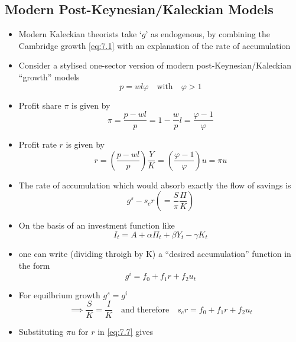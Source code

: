 \documentclass{article}
\begin{document}
\subsection{Modern Post-Keynesian/Kaleckian Models}
	\begin{itemize}
		\item Modern Kaleckian theorists take `\( g \)' as endogenous, by combining the Cambridge growth \cref{eq:7.1} with an explanation of the rate of accumulation
		\item Consider a stylised one-sector version of modern post-Keynesian/Kaleckian ``growth'' models
		\begin{equation}
			p = wl\varphi \quad\text{with}\quad \varphi>1 \label{eq:7.2}
		\end{equation}
		\item Profit share \( \pi \) is given by
		\begin{equation}
			\pi = \frac{p-wl}{p} = 1-\frac{w}{p}l = \frac{\varphi-1}{\varphi} \label{eq:7.3}
		\end{equation}
		\item Profit rate \( r \) is given by
		\begin{equation}
			r=\left(\frac{p-wl}{p}\right)\frac{Y}{K} = \left( \frac{\varphi-1}{\varphi} \right) u = \pi u \label{eq:7.4}
		\end{equation}
		\item The rate of accumulation which would absorb exactly the flow of savings is
		\begin{equation}
			g^s - s_c r \left( =\frac{S}{\pi}\frac{\Pi}{K} \right) \label{eq:7.5}
		\end{equation}
		\item On the basis of an investment function like
		\begin{equation}
			I_t = A + \alpha\Pi_t + \beta Y_t - \gamma K_t \label{eq:7.6}
		\end{equation}
		\item one can write (dividing throigh by K) a ``desired accumulation'' function in the form
		\begin{equation}
			g^i = f_0 + f_1r + f_2u_t \label{eq:7.7}
		\end{equation}
		\item For equilbrium growth \( g^s = g^i \)
		\begin{equation}
			\implies \frac{S}{K}=\frac{I}{K} \quad\text{and therefore}\quad s_c r = f_0+f_1r+f_2 u_t \label{eq:7.8}
		\end{equation}
		\item Substituting \( \pi u \) for \( r \) in \cref{eq:7.7} gives

\end{itemize}
\end{document}
